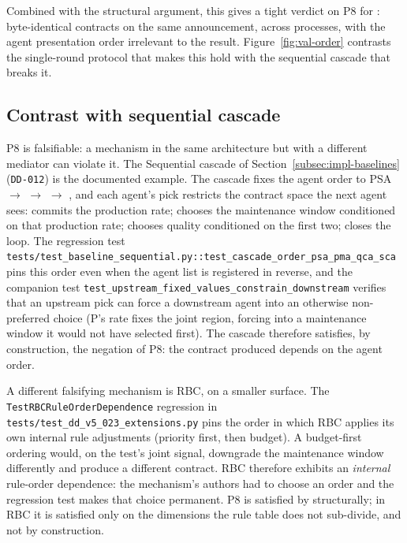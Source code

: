 Combined with the structural argument, this gives a tight verdict on
P8 for \NEXUS{}: byte-identical contracts on the same announcement,
across processes, with the agent presentation order irrelevant to
the result. Figure~\ref{fig:val-order} contrasts the single-round
protocol that makes this hold with the sequential cascade that
breaks it.


\subsection*{Contrast with sequential cascade}

P8 is falsifiable: a mechanism in the same architecture but with a
different mediator can violate it. The Sequential cascade of
Section~\ref{subsec:impl-baselines} (\texttt{DD-012}) is the
documented example. The cascade fixes the agent order to
PSA $\to$ \PMA{} $\to$ \QCA{} $\to$ \SCA{}, and each agent's pick
restricts the contract space the next agent sees: \PSA{} commits
the production rate; \PMA{} chooses the maintenance window
conditioned on that production rate; \QCA{} chooses quality
conditioned on the first two; \SCA{} closes the loop. The
regression test
\texttt{tests/test\_baseline\_sequential.py::test\_cascade\_order\_psa\_pma\_qca\_sca}
pins this order even when the agent list is registered in reverse,
and the companion test
\texttt{test\_upstream\_fixed\_values\_constrain\_downstream}
verifies that an upstream pick can force a downstream agent into an
otherwise non-preferred choice (P\PSA{}'s rate fixes the joint
region, forcing \PMA{} into a maintenance window it would not
have selected first). The cascade therefore satisfies, by
construction, the negation of P8: the contract produced depends on
the agent order.

A different falsifying mechanism is RBC, on a smaller surface. The
\texttt{TestRBCRuleOrderDependence} regression in
\texttt{tests/test\_dd\_v5\_023\_extensions.py} pins the order in
which RBC applies its own internal rule adjustments (priority
first, then budget). A budget-first ordering would, on the test's
joint signal, downgrade the maintenance window differently and
produce a different contract. RBC therefore exhibits an
\emph{internal} rule-order dependence: the mechanism's authors had
to choose an order and the regression test makes that choice
permanent. P8 is satisfied by \NEXUS{} structurally; in RBC it is
satisfied only on the dimensions the rule table does not
sub-divide, and not by construction.

